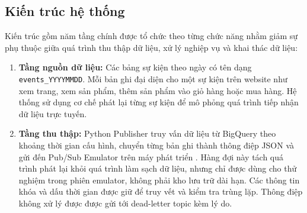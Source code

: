 \subsection{Kiến trúc hệ thống}

Kiến trúc gồm năm tầng chính được tổ chức theo từng chức năng nhằm giảm sự phụ thuộc giữa quá trình thu thập dữ liệu, xử lý nghiệp vụ và khai thác dữ liệu:

\begin{enumerate}
    \item \textbf{Tầng nguồn dữ liệu:} Các bảng sự kiện theo ngày có tên dạng \texttt{events\_YYYYMMDD}. Mỗi bản ghi đại diện cho một sự kiện trên website như xem trang, xem sản phẩm, thêm sản phẩm vào giỏ hàng hoặc mua hàng. Hệ thống sử dụng cơ chế phát lại từng sự kiện để mô phỏng quá trình tiếp nhận dữ liệu trực tuyến.

    \item \textbf{Tầng thu thập:} Python Publisher truy vấn dữ liệu từ BigQuery theo khoảng thời gian cấu hình, chuyển từng bản ghi thành thông điệp JSON và gửi đến Pub/Sub Emulator trên máy phát triển \parencite{pubsub-emulator}. Hàng đợi này tách quá trình phát lại khỏi quá trình làm sạch dữ liệu, nhưng chỉ được dùng cho thử nghiệm trong phiên emulator, không phải kho lưu trữ dài hạn. Các thông tin khóa và dấu thời gian được giữ để truy vết và kiểm tra trùng lặp. Thông điệp không xử lý được được gửi tới dead-letter topic kèm lý do.


\end{enumerate}
